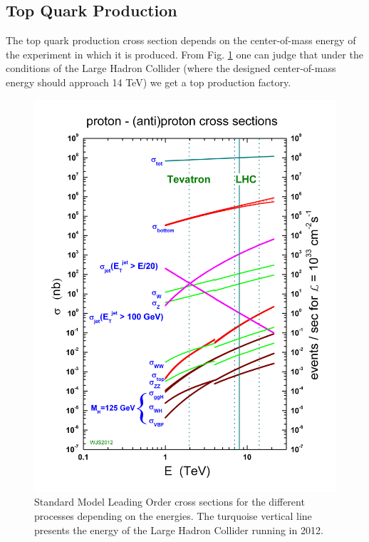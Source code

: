 \subsection{Top Quark Production}

The top quark production cross section depends on the center-of-mass energy of the experiment in which it is produced. From Fig. \ref{fig:SM_XSec_Prod}
one can judge that under the conditions of the Large Hadron Collider (where the designed center-of-mass energy should approach 14 TeV) we get 
a top production factory.

\begin{figure}[t]
  \centering
  \includegraphics[width=1.0\textwidth]{01_Theory_SM/plots/crosssections2013.png}
  \caption{Standard Model Leading Order cross sections for the different processes depending on the energies. The turquoise vertical line presents the energy
  of the Large Hadron Collider running in 2012.}
  \label{fig:SM_XSec_Prod}
\end{figure}

